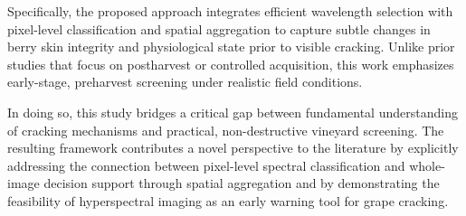 \medskip
\noindent
Specifically, the proposed approach integrates efficient wavelength selection with pixel-level
classification and spatial aggregation to capture subtle changes in berry skin integrity and
physiological state prior to visible cracking. Unlike prior studies that focus on postharvest
or controlled acquisition, this work emphasizes early-stage, preharvest screening under realistic field
conditions.

\medskip
\noindent
In doing so, this study bridges a critical gap between fundamental understanding of
cracking mechanisms and practical, non-destructive vineyard screening. The resulting
framework contributes a novel perspective to the literature by explicitly addressing the
connection between pixel-level spectral classification and whole-image decision support through spatial aggregation and by demonstrating the feasibility of
hyperspectral imaging as an early warning tool for grape cracking.
